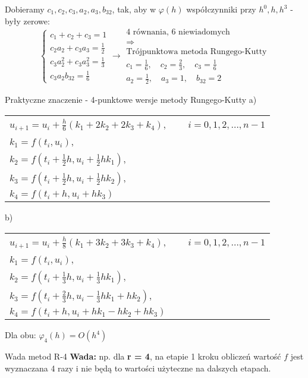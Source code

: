 \begin{frame}
    \begin{center}
    	Dobieramy $c_1,c_2,c_3,a_2,a_3,b_{32}$, tak, aby w $\varphi(h)$ współczynniki przy $h^0,h,h^3$ - były zerowe:
        $$\left\{\begin{array}{l}
        c_1+c_2+c_3 = 1\\
        c_2a_2+c_3a_3 = \frac{1}{2} \\
        c_3a_2^2+c_3a_3^2 = \frac{1}{3} \\
        c_3a_2b_{32} = \frac{1}{6}
        \end{array}\right.\rightarrow\left.\begin{array}{c}
        \text{4 równania, 6 niewiadomych}\\
        \Rightarrow \\
        \text{Trójpunktowa metoda Rungego-Kutty} \\
        c_1 = \frac{1}{6},\quad c_2 = \frac{2}{3}, \quad c_3 = \frac{1}{6} \\
        a_2 = \frac{1}{2},\quad a_3 = 1, \quad b_{32} = 2
        \end{array}\right.$$
    \end{center}
\end{frame}
\begin{frame}{Praktyczne znaczenie - 4-punktowe wersje metody Rungego-Kutty}
	a)
    \begin{center}
    	\begin{tabular}{l}
    		$u_{i+1} = u_i+\frac{h}{6}(k_1+2k_2+2k_3+k_4)$, $\qquad i = 0,1,2, \ldots,n-1$\\
            $k_1 = f(t_i,u_i)$,\\
            $k_2 = f(t_i+\frac{1}{2}h,u_i+\frac{1}{2}hk_1)$,\\
            $k_3 = f(t_i+\frac{1}{2}h,u_i+\frac{1}{2}hk_2)$,\\
            $k_4 = f(t_i+h,u_i+hk_3)$
    	\end{tabular}
    \end{center}
    b) 
      \begin{center}
    	\begin{tabular}{l}
    		$u_{i+1} = u_i+\frac{h}{8}(k_1+3k_2+3k_3+k_4)$, $\qquad i = 0,1,2, \ldots,n-1$\\
            $k_1 = f(t_i,u_i)$,\\
            $k_2 = f(t_i+\frac{1}{3}h,u_i+\frac{1}{3}hk_1)$,\\
            $k_3 = f(t_i+\frac{2}{3}h,u_i-\frac{1}{3}hk_1+hk_2)$,\\
            $k_4 = f(t_i+h,u_i+hk_1-hk_2+hk_3)$
    	\end{tabular}
    \end{center}
  	Dla obu: $\varphi_4(h) = O(h^4)$
\end{frame}
\begin{frame}{Wada metod R-4}
	\textbf{Wada:} \quad np. dla \textbf{r = 4}, na etapie 1 kroku obliczeń wartość $f$ jest wyznaczana 4 razy i nie będą to wartości użyteczne na dalszych etapach.\newline\par
\end{frame}
